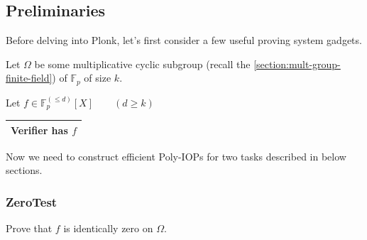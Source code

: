 \documentclass[../lecture-notes.tex]{subfiles}
\begin{document}
\subsection{Preliminaries}
Before delving into Plonk, let's first consider a few useful proving system gadgets.

Let $\Omega$ be some multiplicative cyclic subgroup (recall the \ref{section:mult-group-finite-field}) of $\mathbb{F}_p$ of size $k$. 

Let $f \in \mathbb{F}_p^{(\leq d)}[X] \qquad (d \geq k)$ \begin{tabular}{|c|}\hline Verifier has $f$ \\ \hline \end{tabular} 

Now we need to construct efficient Poly-IOPs for two tasks described in below sections.

\subsubsection{ZeroTest}

Prove that $f$ is identically zero on $\Omega$.
\end{document}
